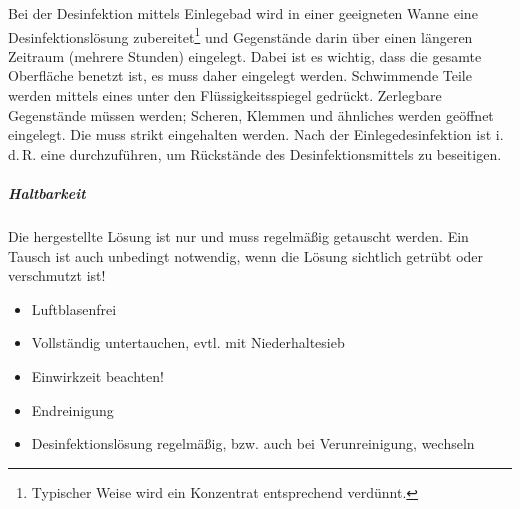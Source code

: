 {%

Bei der Desinfektion
mittels Einlegebad wird in einer geeigneten Wanne eine Desinfektionslösung
zubereitet\footnote{Typischer Weise wird ein Konzentrat
entsprechend verdünnt.} und Gegenstände darin über einen
längeren Zeitraum (mehrere Stunden) eingelegt.
Dabei ist es wichtig, dass die gesamte Oberfläche benetzt
ist, es muss daher  eingelegt werden.
Schwimmende Teile werden mittels eines 
unter den Flüssigkeitsspiegel gedrückt. Zerlegbare
Gegenstände müssen  werden;
Scheren, Klemmen und ähnliches werden geöffnet eingelegt. Die
 muss strikt eingehalten werden. Nach der
Einlegedesinfektion ist i.\,d.\,R. eine 
durchzuführen, um Rückstände des Desinfektionsmittels zu
beseitigen.



\subparagraph{Haltbarkeit}
Die hergestellte Lösung ist nur  und muss
regelmäßig getauscht werden. Ein Tausch ist auch unbedingt
notwendig, wenn die Lösung sichtlich getrübt oder verschmutzt
ist!


}{
\begin{itemize}
  \item Luftblasenfrei
  \item Vollständig untertauchen, evtl. mit Niederhaltesieb
  \item Einwirkzeit beachten! 
  \item Endreinigung
  \item Desinfektionslösung regelmäßig, bzw. auch bei Verunreinigung, wechseln
\end{itemize}
}{}{}{}

